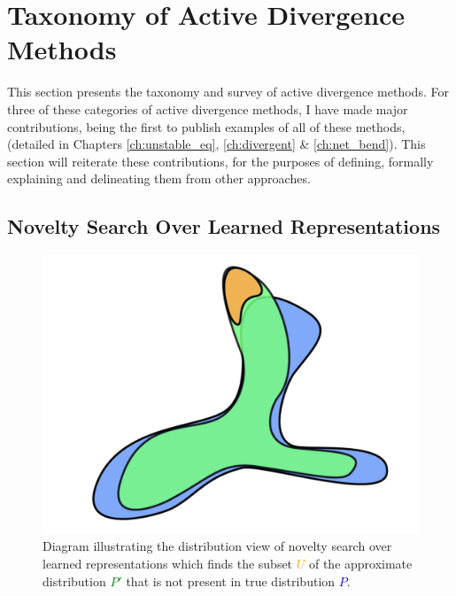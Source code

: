 \section{Taxonomy of Active Divergence Methods}
\label{c6:sec:taxonomy}

This section presents the taxonomy and survey of active divergence methods. 
For three of these categories of active divergence methods, I have made major contributions, being the first to publish examples of all of these methods, (detailed in Chapters \ref{ch:unstable_eq}, \ref{ch:divergent} \& \ref{ch:net_bend}).
This section will reiterate these contributions, for the purposes of defining, formally explaining and delineating them from other approaches.

\subsection{Novelty Search Over Learned Representations}
\label{survey:noveltysearch}

\begin{figure}[!htbp]
    \centering
    \includegraphics[width=1\textwidth]{figures/c6_active_div/diagrams/novelty_search.png}
    \caption[Diagram illustrating the distribution view of novelty search over learned representations.]{Diagram illustrating the distribution view of novelty search over learned representations which finds the subset \textcolor{orange}{$U$} of the approximate distribution \textcolor{green}{$P'$} that is not present in true distribution \textcolor{blue}{$P$}.}
  \label{fig:c6:novelty-search}
  \end{figure}


